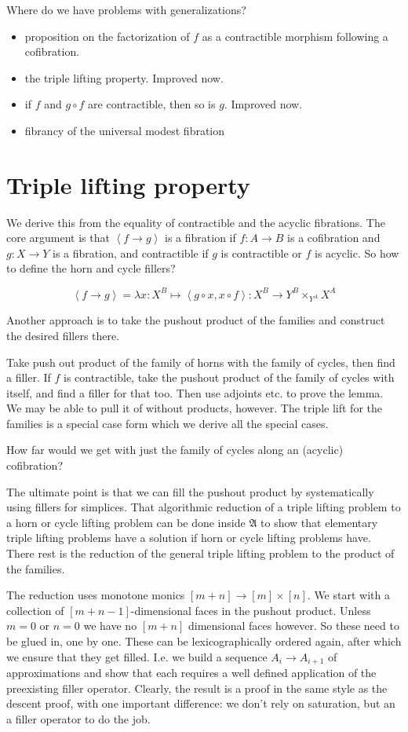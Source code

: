 \documentclass{tac}
\newcommand\of{:}
\newcommand\tuplet[1]{\left\langle #1 \right\rangle}
\newcommand\ambient{\mathfrak A}
\newcommand\function[2]{\lambda #1 \mapsto #2}
\begin{document}
Where do we have problems with generalizations?
\begin{itemize}
\item proposition on the factorization of $f$ as a contractible morphism following a cofibration.
\item the triple lifting property. Improved now.
\item if $f$ and $g\circ f$ are contractible, then so is $g$. Improved now.
\item fibrancy of the universal modest fibration
\end{itemize}

\section{Triple lifting property}
We derive this from the equality of contractible and the acyclic fibrations. The core argument is that $\tuplet{f\to g}$ is a fibration if $f\of A\to B$ is a cofibration and $g\of X\to Y$ is a fibration, and contractible if $g$ is contractible or $f$ is acyclic. So how to define the horn and cycle fillers?

\[ \tuplet{f\to g} = \function{x\of X^B}\tuplet{g\circ x,x\circ f}\of X^B \to Y^B\times_{Y^A} X^A \]

Another approach is to take the pushout product of the families and construct the desired fillers there.

Take push out product of the family of horns with the family of cycles, then find a filler.
If $f$ is contractible, take the pushout product of the family of cycles with itself, and find a filler for that too.
Then use adjoints etc. to prove the lemma.
We may be able to pull it of without products, however. The triple lift for the families is a special case form which we derive all the special cases.

How far would we get with just the family of cycles along an (acyclic) cofibration?

The ultimate point is that we can fill the pushout product by systematically using fillers for simplices.
That algorithmic reduction of a triple lifting problem to a horn or cycle lifting problem can be done inside $\ambient$ to show that elementary triple lifting problems have a solution if horn or cycle lifting problems have. There rest is the reduction of the general triple lifting problem to the product of the families.

The reduction uses monotone monics $[m + n]\to[m]\times[n]$. 
We start with a collection of $[m+n-1]$-dimensional faces in the pushout product. Unless $m=0$ or $n=0$ we have no $[m+n]$ dimensional faces however. So these need to be glued in, one by one.
These can be lexicographically ordered again, after which we ensure that they get filled.
I.e. we build a sequence $A_i\to A_{i+1}$ of approximations and show that each requires a well defined application of the preexisting filler operator.
Clearly, the result is a proof in the same style as the descent proof, with one important difference: we don't rely on saturation, but an a filler operator to do the job.
\end{document}
